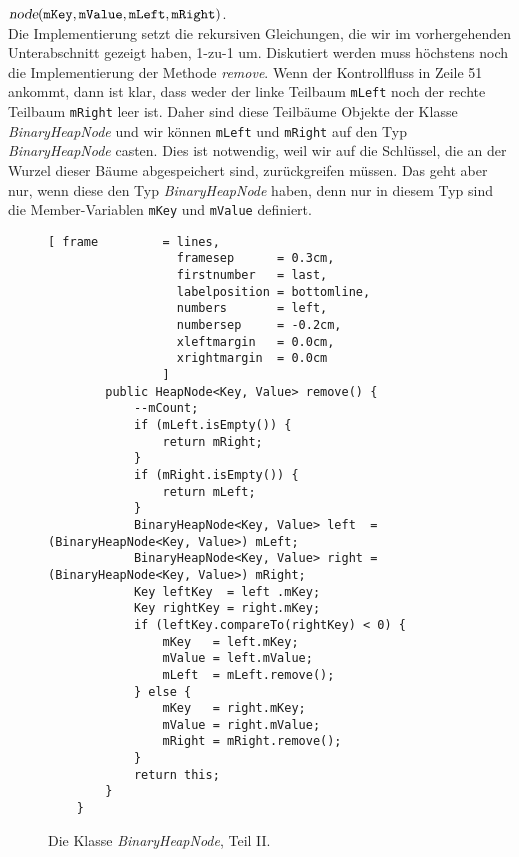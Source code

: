 \hspace*{1.3cm} 
$\textsl{node}(\texttt{mKey}, \mathtt{mValue}, \mathtt{mLeft}, \mathtt{mRight})$. 
\\[0.1cm]
Die Implementierung setzt die rekursiven Gleichungen, die wir im vorhergehenden
Unterabschnitt gezeigt haben, 1-zu-1 um.  Diskutiert werden muss h\"ochstens noch die
Implementierung der Methode \textsl{remove}.  Wenn der Kontrollfluss in Zeile 51 ankommt,
dann ist klar, dass weder der linke Teilbaum \texttt{mLeft} noch der rechte Teilbaum
\texttt{mRight} leer ist.
Daher sind diese Teilb\"aume Objekte der Klasse \textsl{BinaryHeapNode} und wir k\"onnen
\texttt{mLeft} und \texttt{mRight} auf den Typ \textsl{BinaryHeapNode} casten.
Dies ist notwendig, weil wir auf die Schl\"ussel, die an der Wurzel dieser B\"aume
abgespeichert sind, zur\"uckgreifen m\"ussen.  Das geht aber nur, wenn diese den Typ
\textsl{BinaryHeapNode} haben, denn nur in diesem Typ sind die Member-Variablen
\texttt{mKey} und \texttt{mValue} definiert.

\begin{figure}[!h]
  \centering
\begin{Verbatim}[ frame         = lines, 
                  framesep      = 0.3cm, 
                  firstnumber   = last,
                  labelposition = bottomline,
                  numbers       = left,
                  numbersep     = -0.2cm,
                  xleftmargin   = 0.0cm,
                  xrightmargin  = 0.0cm
                ]
        public HeapNode<Key, Value> remove() {
            --mCount;
            if (mLeft.isEmpty()) {
                return mRight;
            } 
            if (mRight.isEmpty()) {
                return mLeft;
            }
            BinaryHeapNode<Key, Value> left  = (BinaryHeapNode<Key, Value>) mLeft;
            BinaryHeapNode<Key, Value> right = (BinaryHeapNode<Key, Value>) mRight;
            Key leftKey  = left .mKey;
            Key rightKey = right.mKey;
            if (leftKey.compareTo(rightKey) < 0) {
                mKey   = left.mKey;
                mValue = left.mValue;
                mLeft  = mLeft.remove();
            } else {
                mKey   = right.mKey;
                mValue = right.mValue;
                mRight = mRight.remove();
            }
            return this;
        }
    }
\end{Verbatim}
\vspace*{-0.3cm}
  \caption{Die Klasse \textsl{BinaryHeapNode}, Teil II.}
  \label{fig:BinaryHeapNode-II}
\end{figure}


